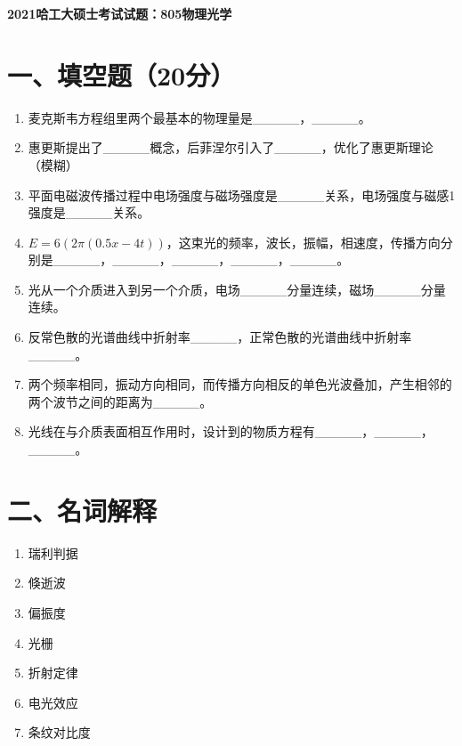 \documentclass[12pt, a4paper]{article}
\theoremstyle{solution}
\begin{document}
\begin{center}
\Large\textbf{2021哈工大硕士考试试题：805物理光学}
\end{center}





\section*{一、填空题（20分）}
\begin{enumerate}
    \item 麦克斯韦方程组里两个最基本的物理量是\_\_\_\_\_，\_\_\_\_\_。
    \item 惠更斯提出了\_\_\_\_\_概念，后菲涅尔引入了\_\_\_\_\_，优化了惠更斯理论（模糊）
    \item 平面电磁波传播过程中电场强度与磁场强度是\_\_\_\_\_关系，电场强度与磁感1强度是\_\_\_\_\_关系。
    \item $E=6(2\pi (0.5x-4t))$，这束光的频率，波长，振幅，相速度，传播方向分别是\_\_\_\_\_，\_\_\_\_\_，\_\_\_\_\_，\_\_\_\_\_，\_\_\_\_\_。
    \item 光从一个介质进入到另一个介质，电场\_\_\_\_\_分量连续，磁场\_\_\_\_\_分量连续。
    \item 反常色散的光谱曲线中折射率\_\_\_\_\_，正常色散的光谱曲线中折射率\_\_\_\_\_。
    \item 两个频率相同，振动方向相同，而传播方向相反的单色光波叠加，产生相邻的两个波节之间的距离为\_\_\_\_\_。
    \item 光线在与介质表面相互作用时，设计到的物质方程有\_\_\_\_\_，\_\_\_\_\_，\_\_\_\_\_。
\end{enumerate}
\section*{二、名词解释}
\begin{enumerate}
    \item 瑞利判据
    \item 倏逝波
    \item 偏振度
    \item 光栅
    \item 折射定律
    \item 电光效应
    \item 条纹对比度
\end{enumerate}
\end{document}
